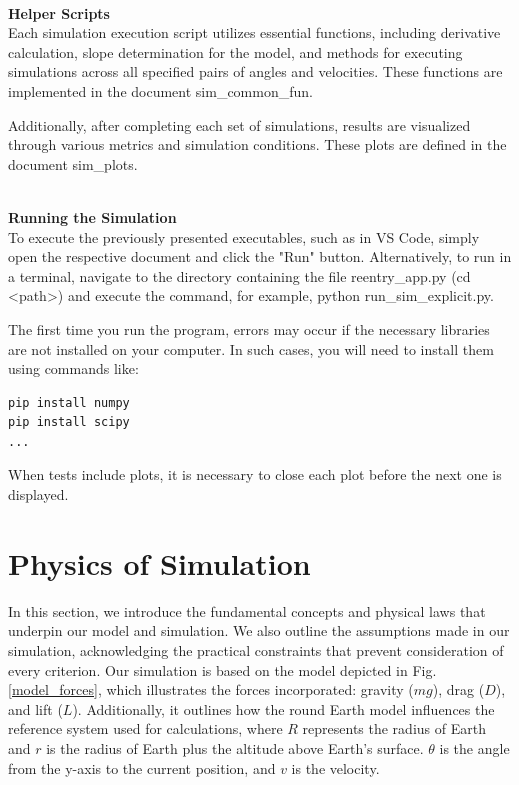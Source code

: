 \documentclass[runningheads]{llncs}
\begin{document}
\noindent \textbf{\\Helper Scripts\\}
Each simulation execution script utilizes essential functions, including derivative calculation, slope determination for the model, and methods for executing simulations across all specified pairs of angles and velocities. These functions are implemented in the document sim\_common\_fun.

Additionally, after completing each set of simulations, results are visualized through various metrics and simulation conditions. These plots are defined in the document sim\_plots.

\noindent \textbf{\\Running the Simulation\\}
To execute the previously presented executables, such as in VS Code, simply open the respective document and click the "Run" button. Alternatively, to run in a terminal, navigate to the directory containing the file reentry\_app.py (cd <path>) and execute the command, for example, python run\_sim\_explicit.py.

The first time you run the program, errors may occur if the necessary libraries are not installed on your computer. In such cases, you will need to install them using commands like:

\begin{verbatim}
pip install numpy
pip install scipy
...
\end{verbatim}

When tests include plots, it is necessary to close each plot before the next one is displayed.













\section{Physics of Simulation}
In this section, we introduce the fundamental concepts and physical laws that underpin our model and simulation. We also outline the assumptions made in our simulation, acknowledging the practical constraints that prevent consideration of every criterion. Our simulation is based on the model depicted in Fig. \ref{model_forces}, which illustrates the forces incorporated: gravity ($mg$), drag ($D$), and lift ($L$). Additionally, it outlines how the round Earth model influences the reference system used for calculations, where $R$ represents the radius of Earth and $r$ is the radius of Earth plus the altitude above Earth's surface. $\theta$ is the angle from the y-axis to the current position, and $v$ is the velocity.
\end{document}
